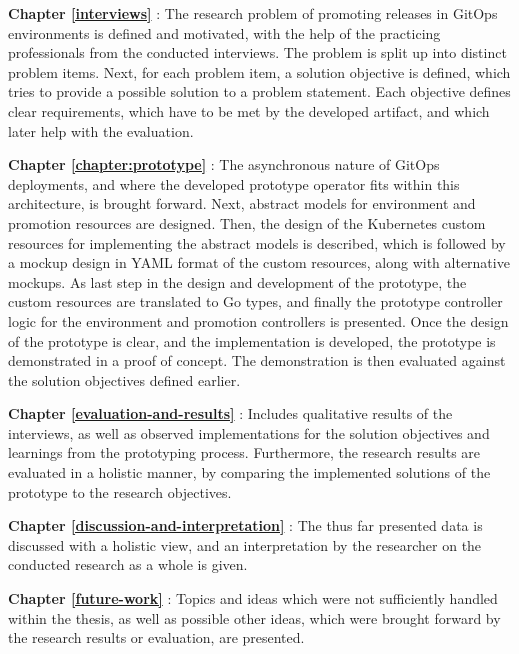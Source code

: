 \textbf{Chapter \ref{interviews} }:
The research problem of promoting releases in GitOps environments is defined and motivated,
with the help of the practicing professionals from the conducted interviews.
The problem is split up into distinct problem items.
Next, for each problem item,
a solution objective is defined, which tries to provide a possible solution to a problem statement.
Each objective defines clear requirements, which have to be met by the developed artifact,
and which later help with the evaluation.

\textbf{Chapter \ref{chapter:prototype} }:
The asynchronous nature of GitOps deployments,
and where the developed prototype operator fits within this architecture, is brought forward.
Next, abstract models for environment and promotion resources are designed.
Then, the design of the Kubernetes custom resources for implementing the abstract models is described,
which is followed by a mockup design in YAML format of the custom resources, along with alternative mockups.
As last step in the design and development of the prototype, the custom resources are translated
to Go types, and finally
the prototype controller logic for the environment and promotion controllers is presented.
Once the design of the prototype is clear, and the implementation is developed,
the prototype is demonstrated in a proof of concept.
The demonstration is then evaluated against the solution objectives defined earlier.

\textbf{Chapter \ref{evaluation-and-results} }:
Includes qualitative results of the interviews, as well as observed implementations
for the solution objectives and learnings from the prototyping process.
Furthermore, the research results are evaluated in a holistic manner,
by comparing the implemented solutions of the prototype to the research objectives.

\textbf{Chapter \ref{discussion-and-interpretation} }:
The thus far presented data is discussed with a holistic view,
and an interpretation by the researcher on the conducted research as a whole is given.

\textbf{Chapter \ref{future-work} }:
Topics and ideas which were not sufficiently handled within the thesis,
as well as possible other ideas, which were brought forward by the research results or evaluation,
are presented.

